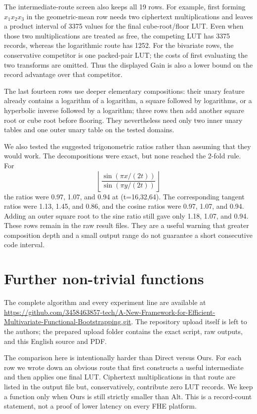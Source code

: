 \documentclass[10pt]{article}
\begin{document}
The intermediate-route screen also keeps all 19 rows.  For example, first
forming \(x_1x_2x_3\) in the geometric-mean row needs two ciphertext
multiplications and leaves a product interval of 3375 values for the final
cube-root/floor LUT.  Even when those two multiplications are treated as free,
the competing LUT has 3375 records, whereas the logarithmic route has 1252.
For the bivariate rows, the conservative competitor is one packed-pair LUT;
the costs of first evaluating the two transforms are omitted.  Thus the
displayed Gain is also a lower bound on the record advantage over that
competitor.

The last fourteen rows use deeper elementary compositions: their unary feature
already contains a logarithm of a logarithm, a square followed by logarithms, or
a hyperbolic inverse followed by a logarithm; three rows then add another square
root or cube root before flooring.  They nevertheless need only two inner unary
tables and one outer unary table on the tested domains.

We also tested the suggested trigonometric ratios rather than assuming that they
would work.  The decompositions were exact, but none reached the 2-fold rule.
For
\[
 \left\lfloor\frac{\sin(\pi x/(2t))}{\sin(\pi y/(2t))}\right\rfloor
\]
the ratios were 0.97, 1.07, and 0.94 at (t=16,32,64).  The corresponding
tangent ratios were 1.13, 1.45, and 0.86, and the cosine ratios were 0.97,
1.07, and 0.94.  Adding an outer square root to the sine ratio still gave only
1.18, 1.07, and 0.94.  These rows remain in the raw result files.  They are a
useful warning that greater composition depth and a small output range do not
guarantee a short consecutive code interval.

\section{Further non-trivial functions}

The complete algorithm and every experiment line are available at
\url{https://github.com/3458463857-tech/A-New-Framework-for-Efficient-Multivariate-Functional-Bootstrapping.git}.
The repository upload itself is left to the authors; the prepared upload folder
contains the exact script, raw outputs, and this English source and PDF.

The comparison here is intentionally harder than Direct versus Ours.  For each
row we wrote down an obvious route that first constructs a useful intermediate
and then applies one final LUT.  Ciphertext multiplications in that route are
listed in the output file but, conservatively, contribute zero LUT records.  We
keep a function only when Ours is still strictly smaller than Alt.  This is a
record-count statement, not a proof of lower latency on every FHE platform.
\end{document}
